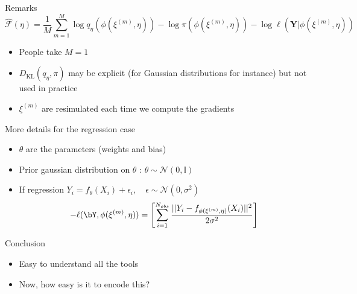 \documentclass[compress,10pt]{beamer}
\begin{document}
\begin{frame}{Remarks}
$$\widehat{\mathcal{F}}(\eta) = \frac{1}{M}\sum_{m=1}^M   \log q_{\eta}(\phi(\xi^{(m)},\eta)) - \log \pi(\phi(\xi^{(m)},\eta)) - \log \ell(\mathbf{Y}| \phi(\xi^{(m)},\eta))$$

 \begin{itemize}
 \item  People take $M=1$  
  \item  $D_{\text{KL}}(q_{\eta},\pi)$ may be explicit (for Gaussian distributions for instance) but not used in practice
  \item  $\xi^{(m)}$ are resimulated each time we compute the gradients
  \end{itemize}
\end{frame}
  
\begin{frame}{More details for the regression case}

\begin{itemize}
 \item $\theta$ are the parameters (weights and bias)
 \item Prior gaussian distribution on $\theta$ : $\theta \sim \mathcal{N}(0, \mathbb{I})$
 \item If regression  $Y_i = f_\theta(X_i) + \epsilon_i, \quad \epsilon \sim \mathcal{N}(0,\sigma^2)$ 
 $$-\ell(\bY,\phi(\xi^{(m)},\eta)) = \left[\sum_{i=1}^{N_{obs}}   \frac{||Y_i - f_{ \phi(\xi^{(m)},\eta) }(X_i)||^2}{2\sigma^2}\right]$$ 
 
\end{itemize}



\end{frame}



\begin{frame}{Conclusion}

\begin{itemize}
 \item Easy to understand all the tools
 \item Now, how easy is it to encode this? 
\end{itemize}


\end{frame}
\end{document}
